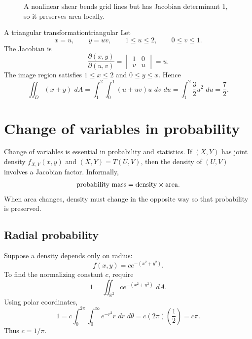 \documentclass[11pt]{article}
\newcommand{\R}{\mathbb R}
\newcommand{\dd}{\,d}
\begin{document}
\begin{figure}[H]
\centering
{}
\caption{A nonlinear shear bends grid lines but has Jacobian determinant $1$, so it preserves area locally.}
\end{figure}

\begin{workedexample}{A triangular transformation}{triangular}
Let
\[
x=u,
\qquad y=uv,
\qquad 1\le u\le2,
\qquad 0\le v\le1.
\]
The Jacobian is
\[
\frac{\partial(x,y)}{\partial(u,v)}=
\begin{vmatrix}1&0\\v&u\end{vmatrix}=u.
\]
The image region satisfies $1\le x\le2$ and $0\le y\le x$. Hence
\[
\iint_D(x+y)\,\dd A=\int_1^2\int_0^1 (u+uv)u\,\dd v\,\dd u
=\int_1^2\frac32u^2\,\dd u=\frac72.
\]
\end{workedexample}

\section{Change of variables in probability}

Change of variables is essential in probability and statistics. If $(X,Y)$ has joint density $f_{X,Y}(x,y)$ and $(X,Y)=T(U,V)$, then the density of $(U,V)$ involves a Jacobian factor. Informally,
\[
\hbox{probability mass}=\hbox{density}\times\hbox{area}.
\]
When area changes, density must change in the opposite way so that probability is preserved.

\subsection*{Radial probability}
Suppose a density depends only on radius:
\[
f(x,y)=c e^{-(x^2+y^2)}.
\]
To find the normalizing constant $c$, require
\[
1=\iint_{\R^2}c e^{-(x^2+y^2)}\,\dd A.
\]
Using polar coordinates,
\[
1=c\int_0^{2\pi}\int_0^\infty e^{-r^2}r\,\dd r\,\dd\theta
=c(2\pi)\left(\frac12\right)=c\pi.
\]
Thus $c=1/\pi$.
\end{document}
